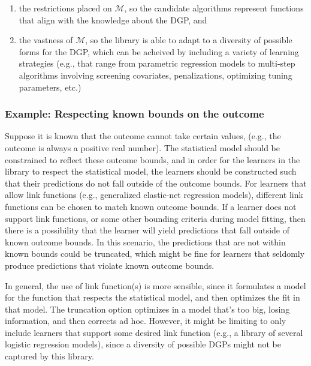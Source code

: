 \documentclass[
  12pt, krantz2,
]{krantz}
\providecommand{\tightlist}{%
  \setlength{\itemsep}{0pt}\setlength{\parskip}{0pt}}
\theoremstyle{definition}
\theoremstyle{definition}
\theoremstyle{definition}
\newcommand{\1}{\mathbbm{1}}
\begin{document}
\begin{enumerate}
\def\labelenumi{\arabic{enumi}.}
\tightlist
\item
  the restrictions placed on \(\mathcal{M}\), so the candidate algorithms
  represent functions that align with the knowledge about the DGP, and
\item
  the vastness of \(\mathcal{M}\), so the library is able to adapt to a
  diversity of possible forms for the DGP, which can be acheived by including
  a variety of learning strategies (e.g., that range from parametric regression
  models to multi-step algorithms involving screening covariates,
  penalizations, optimizing tuning parameters, etc.)
\end{enumerate}

\hypertarget{example-respecting-known-bounds-on-the-outcome}{%
\subsubsection{Example: Respecting known bounds on the outcome}\label{example-respecting-known-bounds-on-the-outcome}}

Suppose it is known that the outcome cannot take certain values,
(e.g., the outcome is always a positive real number). The statistical model
should be constrained to reflect these outcome bounds, and in order for the
learners in the library to respect the statistical model, the learners should
be constructed such that their predictions do not fall outside of the outcome
bounds. For learners that allow link functions (e.g., generalized elastic-net
regression models), different link functions can be chosen to match known
outcome bounds. If a learner does not support link functions, or some other
bounding criteria during model fitting, then there is a possibility that the
learner will yield predictions that fall outside of known outcome bounds. In
this scenario, the predictions that are not within known bounds could be
truncated, which might be fine for learners that seldomly produce predictions
that violate known outcome bounds.

In general, the use of link function(s) is more sensible, since it formulates a
model for the function that respects the statistical model, and then optimizes
the fit in that model. The truncation option optimizes in a model that's too
big, losing information, and then corrects ad hoc. However, it might be
limiting to only include learners that support some desired link function
(e.g., a library of several logistic regression models), since a diversity of
possible DGPs might not be captured by this library.
\end{document}
